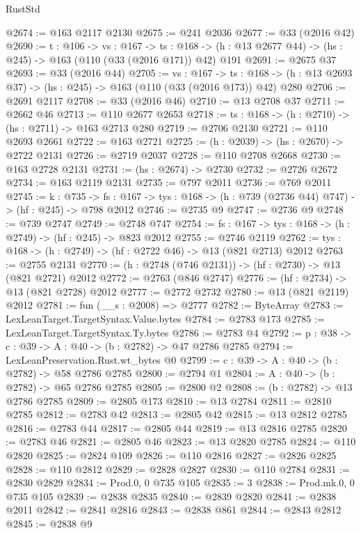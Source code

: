 \begin{lexlean}{RustStd}
\begin{coremodule}
@2674 := @163 @2117 @2130
@2675 := @241 @2036
@2677 := @33 (@2016 @42)
@2690 := {t : @106} ->
  {vs : @167} ->
  {ts : @168} -> (h : @13 @2677 @44) -> (hs : @245) -> @163 (@110 (@33 (@2016 @171)) @42) @191
@2691 := @2675 @37
@2693 := @33 (@2016 @44)
@2705 := {vs : @167} ->
  {ts : @168} -> (h : @13 @2693 @37) -> (hs : @245) -> @163 (@110 (@33 (@2016 @173)) @42) @280
@2706 := @2691 @2117
@2708 := @33 (@2016 @46)
@2710 := @13 @2708 @37
@2711 := @2662 @46
@2713 := @110 @2677 @2653
@2718 := {ts : @168} -> (h : @2710) -> (hs : @2711) -> @163 @2713 @280
@2719 := @2706 @2130
@2721 := @110 @2693 @2661
@2722 := @163 @2721
@2725 := (h : @2039) -> (hs : @2670) -> @2722 @2131
@2726 := @2719 @2037
@2728 := @110 @2708 @2668
@2730 := @163 @2728 @2131
@2731 := (hs : @2674) -> @2730
@2732 := @2726 @2672
@2734 := @163 @2119 @2131
@2735 := @797 @2011
@2736 := @769 @2011
@2745 := {k : @735} ->
  {fs : @167} -> {tys : @168} -> (h : @739 (@2736 @44) @747) -> (hf : @245) -> @798 @2012
@2746 := @2735 @9
@2747 := @2736 @9
@2748 := @739 @2747
@2749 := @2748 @747
@2754 := {fs : @167} -> {tys : @168} -> (h : @2749) -> (hf : @245) -> @823 @2012
@2755 := @2746 @2119
@2762 := {tys : @168} -> (h : @2749) -> (hf : @2722 @46) -> @13 (@821 @2713) @2012
@2763 := @2755 @2131
@2770 := (h : @2748 (@746 @2131)) -> (hf : @2730) -> @13 (@821 @2721) @2012
@2772 := @2763 (@846 @2747)
@2776 := (hf : @2734) -> @13 (@821 @2728) @2012
@2777 := @2772 @2732
@2780 := @13 (@821 @2119) @2012
@2781 := fun (__s : @2008) => @2777
@2782 := ByteArray
@2783 := LexLeanTarget.TargetSyntax.Value.bytes
@2784 := @2783 @173
@2785 := LexLeanTarget.TargetSyntax.Ty.bytes
@2786 := @2783 @4
@2792 := {p : @38} -> {c : @39} -> {A : @40} -> (b : @2782) -> @47 @2786 @2785
@2794 := LexLeanPreservation.Rust.wt_bytes @0
@2799 := {c : @39} -> {A : @40} -> (b : @2782) -> @58 @2786 @2785
@2800 := @2794 @1
@2804 := {A : @40} -> (b : @2782) -> @65 @2786 @2785
@2805 := @2800 @2
@2808 := (b : @2782) -> @13 @2786 @2785
@2809 := @2805 @173
@2810 := @13 @2784
@2811 := @2810 @2785
@2812 := @2783 @42
@2813 := @2805 @42
@2815 := @13 @2812 @2785
@2816 := @2783 @44
@2817 := @2805 @44
@2819 := @13 @2816 @2785
@2820 := @2783 @46
@2821 := @2805 @46
@2823 := @13 @2820 @2785
@2824 := @110 @2820
@2825 := @2824 @109
@2826 := @110 @2816
@2827 := @2826 @2825
@2828 := @110 @2812
@2829 := @2828 @2827
@2830 := @110 @2784
@2831 := @2830 @2829
@2834 := Prod.{0, 0} @735 @105
@2835 := 3
@2838 := Prod.mk.{0, 0} @735 @105
@2839 := @2838 @2835
@2840 := @2839 @2820
@2841 := @2838 @2011
@2842 := @2841 @2816
@2843 := @2838 @861
@2844 := @2843 @2812
@2845 := @2838 @9

\end{coremodule}
\end{lexlean}
